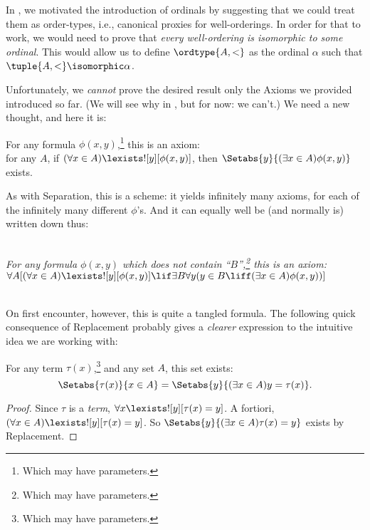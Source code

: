 \documentclass[../../../include/open-logic-section]{subfiles}
\begin{document}

In , we motivated the introduction of ordinals by
suggesting that we could treat them as order-types, i.e., canonical
proxies for well-orderings. In order for that to work, we would need
to prove that \emph{every well-ordering is isomorphic to some
ordinal}. This would allow us to define $\ordtype{A, <}$ as the
ordinal $\alpha$ such that $\tuple{A, <} \isomorphic \alpha$. 

Unfortunately, we \emph{cannot} prove the desired result only the
Axioms we provided introduced so far. (We will see why in
, but for now: we can't.) We need a
new thought, and here it is:

\begin{axiom}
For any formula $\phi(x, y)$,\footnote{Which may have parameters.} this is an axiom: 
	\\for any $A$, if $(\forall x \in A)\lexists![y][\phi(x,y)]$, {then} $\Setabs{y}{(\exists x \in A)\phi(x,y)}$ exists.
\end{axiom}

As with Separation, this is a scheme: it yields infinitely many
axioms, for each of the infinitely many different $\phi$'s. And it can
equally well be (and normally is) written down thus:

\
\\\emph{For any formula $\phi(x,y)$ which does not contain ``$B$'',\footnote{Which may have parameters.} this is an axiom:
\\$\forall A[(\forall x \in A)\lexists![y][\phi(x,y)] \lif \exists B\forall y (y \in B \liff (\exists x \in A)\phi(x,y))]$}

\
\\ 
On first encounter, however, this is quite a tangled formula. The
following quick consequence of Replacement probably gives a
\emph{clearer} expression to the intuitive idea we are working with:

\begin{cor}
For any term $\tau(x)$,\footnote{Which may have parameters.} and any set $A$, this set exists:
\[
	\Setabs{\tau(x)}{x \in A} = \Setabs{y}{(\exists x \in A)y = \tau(x)}.
\]
\end{cor}

\begin{proof}
Since $\tau$ is a \emph{term}, $\forall x \lexists![y][\tau(x) = y]$.
A fortiori, $(\forall x \in A)\lexists![y][\tau(x) = y]$. So
$\Setabs{y}{(\exists x \in A)\tau(x) = y}$ exists by Replacement.
\end{proof}
\end{document}
